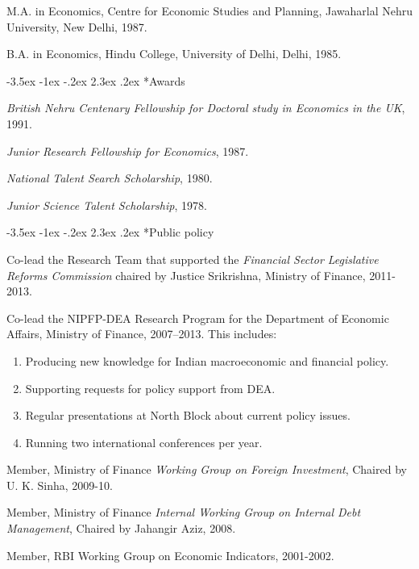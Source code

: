 \documentclass[11pt,a4paper]{article}
\makeatletter
\renewcommand\section{\@startsection {section}{1}{\z@}%
                              {-3.5ex \@plus -1ex \@minus -.2ex}%
                              {2.3ex \@plus.2ex}%
                              {\normalfont\large\bfseries\sffamily}}
\makeatother
\begin{document}
M.A. in Economics, Centre for Economic Studies and Planning, Jawaharlal Nehru University, New Delhi, 1987.

B.A. in Economics, Hindu College, University of Delhi, Delhi, 1985.



\section*{Awards}

\textit{British Nehru Centenary Fellowship for Doctoral study in Economics in the UK}, 1991.

\textit{Junior Research Fellowship for Economics}, 1987.

\textit{National Talent Search Scholarship}, 1980.

\textit{Junior Science Talent Scholarship}, 1978.



\section*{Public policy}

Co-lead the Research Team that supported the \textit{Financial Sector Legislative Reforms Commission} chaired by Justice Srikrishna, Ministry of Finance, 2011-2013.

Co-lead the NIPFP-DEA Research Program for the Department of Economic Affairs, Ministry of Finance, 2007--2013. This includes: {\footnotesize \begin{enumerate} \item Producing new knowledge for Indian macroeconomic and financial policy. \item Supporting requests for policy support from DEA. \item Regular presentations at North Block about current policy issues. \item Running two international conferences per year. \end{enumerate}}

Member, Ministry of Finance \textit{Working Group on Foreign Investment}, Chaired by U. K. Sinha, 2009-10.

Member, Ministry of Finance \textit{Internal Working Group on Internal Debt Management}, Chaired by Jahangir Aziz, 2008.

Member, RBI Working Group on Economic Indicators, 2001-2002.
\end{document}
